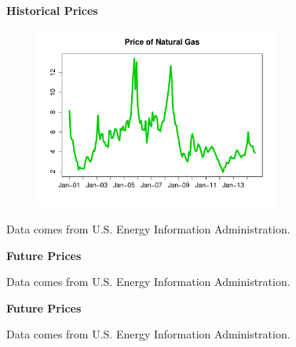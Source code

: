 \documentclass{beamer}
\begin{document}
\begin{frame}
{\bf Historical Prices}
\begin{figure}[hbt]
  \includegraphics[width = 8cm]{PriceNG.pdf}
\end{figure}
\begin{center}
Data comes from U.S. Energy Information Administration.
\end{center}
\end{frame}

\begin{frame}
{\bf Future Prices}
\begin{center}
Data comes from U.S. Energy Information Administration.
\end{center}
\end{frame}

\begin{frame}
{\bf Future Prices}
\begin{center}
Data comes from U.S. Energy Information Administration.
\end{center}
\end{frame}
\end{document}
